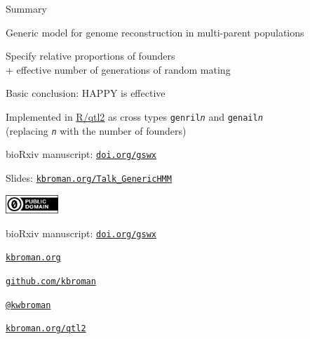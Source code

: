 \documentclass[aspectratio=169,12pt,t]{beamer}
\begin{document}
\begin{frame}[c]{Summary}

  \bbi

\item Generic model for genome reconstruction in multi-parent
  populations

\item Specify relative proportions of founders \\
  + effective number of generations of random mating

\item Basic conclusion: {\hilit HAPPY is effective}

\item Implemented in \href{https://kbroman.org/qtl2}{R/qtl2} as cross types {\tt genril{\emph n}} and
  {\tt genail{\emph n}} \\
  (replacing {\tt \emph n} with the number of founders)

\item bioRxiv manuscript:
  \href{https://doi.org/gswx}{\tt \lolit doi.org/gswx}


  \ei


\end{frame}



\begin{frame}[c]{}

\Large

Slides: \href{https://kbroman.org/Talk_GenericHMM}{\tt kbroman.org/Talk\_GenericHMM}

\vspace*{-7mm}
\hfill
\href{https://creativecommons.org/publicdomain/zero/1.0/}{\includegraphics[height=7mm]{Figs/cc-zero.png}}

\vspace{3mm}

bioRxiv manuscript:
\href{https://doi.org/gswx}{\tt \lolit doi.org/gswx}

\vspace{4mm}

\href{https://kbroman.org}{\tt \lolit kbroman.org}

\vspace{4mm}

\href{https://github.com/kbroman}{\tt \lolit github.com/kbroman}

\vspace{4mm}

\href{https://twitter.com/kwbroman}{\tt \lolit @kwbroman}

\vspace{4mm}

\href{https://kbroman.org/qtl2}{\tt \lolit kbroman.org/qtl2}





\end{frame}
\end{document}
